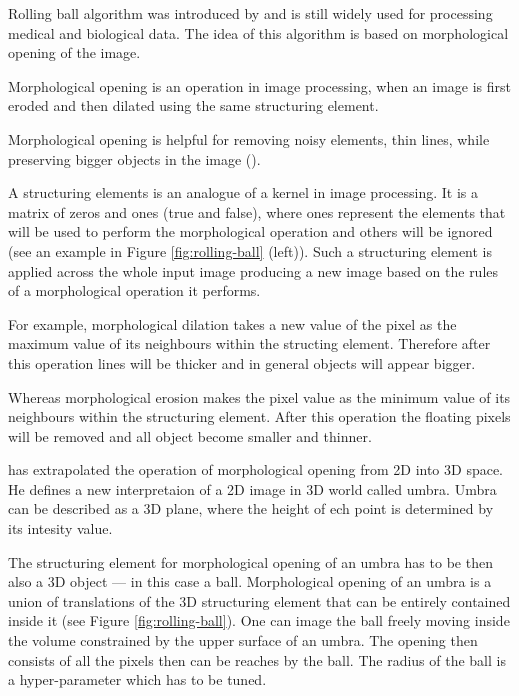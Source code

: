 Rolling ball algorithm was introduced by \cite{Sternberg_1983} and is still widely used for processing medical and biological data. The idea of this algorithm is based on morphological opening of the image. 

\begin{definition}
	Morphological opening is an operation in image processing, when an image is first eroded and then dilated using the same structuring element. 
\end{definition}

Morphological opening is helpful for removing noisy elements, thin lines, while preserving bigger objects in the image (\cite{morph_open}).

A structuring elements is an analogue of a kernel in image processing. It is a matrix of zeros and ones (true and false), where ones represent the elements that will be used to perform the morphological operation and others will be ignored (see an example in Figure \ref{fig:rolling-ball} (left)). Such a structuring element is applied across the whole input image producing a new image based on the rules of a morphological operation it performs.  

For example, morphological dilation takes a new value of the pixel as the maximum value of its neighbours within the structing element. Therefore after this operation lines will be thicker and in general objects will appear bigger.

Whereas morphological erosion makes the pixel value as the minimum value of its neighbours within the structuring element. After this operation the floating pixels will be removed and all object become smaller and thinner.

\cite{Sternberg_1983} has extrapolated the operation of morphological opening from 2D into 3D space. He defines a new interpretaion of a 2D image in 3D world called umbra. Umbra can be described as a 3D plane, where the height of ech point is determined by its intesity value.

The structuring element for morphological opening of an umbra has to be then also a 3D object --- in this case a ball. Morphological opening of an umbra is a union of translations of the 3D structuring element that can be entirely contained inside it (see Figure \ref{fig:rolling-ball}). One can image the ball freely moving inside the volume constrained by the upper surface of an umbra. The opening then consists of all the pixels then can be reaches by the ball. The radius of the ball is a hyper-parameter which has to be tuned.

